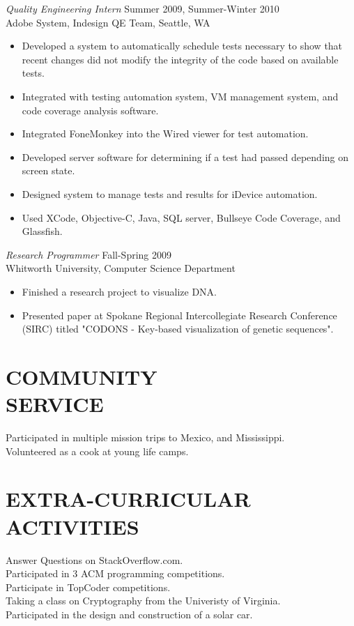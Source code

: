 \documentclass[line,margin]{res}
\begin{document}
\begin{resume}
				{\sl Quality Engineering Intern} \hfill Summer 2009, Summer-Winter 2010 \\
                Adobe System, Indesign QE Team, Seattle, WA
                 \begin{itemize}  \itemsep -2pt %
	                 \item Developed a system to automatically schedule tests necessary to show that recent changes did not modify the integrity of the code based on available tests.
	                \item Integrated with testing automation system, VM management system, and code coverage analysis software.
	                 \item Integrated FoneMonkey into the Wired viewer for test automation.
	                 \item Developed server software for determining if a test had passed depending on screen state.
	                 \item Designed system to manage tests and results for iDevice automation.
	                 \item Used XCode, Objective-C, Java, SQL server, Bullseye Code Coverage, and Glassfish.
 				 \end{itemize}
 								 
                {\sl Research Programmer} \hfill             Fall-Spring 2009 \\
                Whitworth University, Computer Science Department
                 \begin{itemize}  \itemsep -2pt %
	                 \item Finished a research project to visualize DNA.
	                 \item Presented paper at Spokane Regional Intercollegiate Research Conference (SIRC) titled "CODONS - Key-based visualization of genetic sequences".
                 \end{itemize} 				
                 
                 


					
\section{COMMUNITY \\ SERVICE}  
Participated in multiple mission trips to Mexico, and Mississippi. \\
Volunteered as a cook at young life camps.

\section{EXTRA-CURRICULAR \\ ACTIVITIES}
	Answer Questions on StackOverflow.com.\\
	Participated in 3 ACM programming competitions.\\
	Participate in TopCoder competitions.\\
	Taking a class on Cryptography from the Univeristy of Virginia.\\
	Participated in the design and construction of a solar car.
\end{resume}
\end{document}
